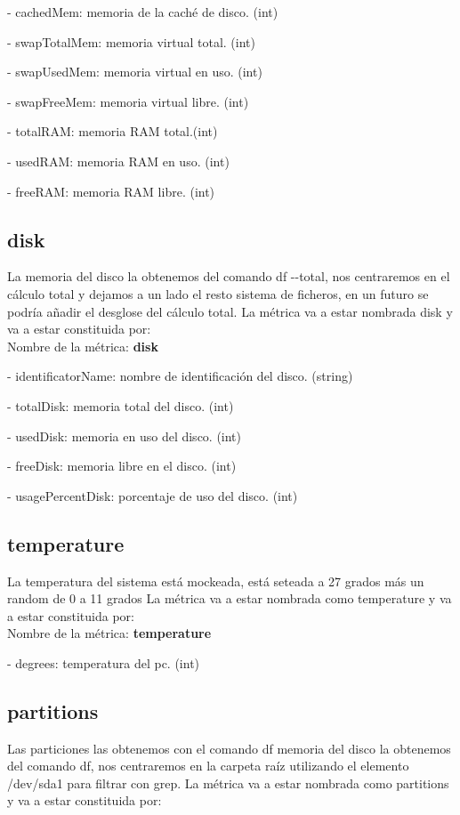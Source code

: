 \documentclass[ spanish, a4paper, 12pt, oneside]{report}
\begin{document}
\hyp{} cachedMem: memoria de la caché de disco. (int)

\hyp{} swapTotalMem: memoria virtual total. (int)

\hyp{} swapUsedMem: memoria virtual en uso. (int)

\hyp{} swapFreeMem: memoria virtual libre. (int)

\hyp{} totalRAM: memoria RAM total.(int)

\hyp{} usedRAM: memoria RAM en uso. (int)

\hyp{} freeRAM: memoria RAM libre. (int)

\subsection{disk}
La memoria del disco la obtenemos del comando df \hyp{}\hyp{}total, nos centraremos en el cálculo total y dejamos a un lado el resto 
sistema de ficheros, en un futuro se podría añadir el desglose del cálculo total. La métrica va a estar nombrada disk
y va a estar constituida por:\\
 
Nombre de la métrica: \textbf{disk}

\hyp{} identificatorName: nombre de identificación del disco. (string)
 
\hyp{} totalDisk: memoria total del disco. (int)
 
\hyp{} usedDisk: memoria en uso del disco. (int)
 
\hyp{} freeDisk: memoria libre en el disco. (int)
 
\hyp{} usagePercentDisk: porcentaje de uso del disco. (int)

\subsection{temperature}
La temperatura del sistema está mockeada, está seteada a 27 grados más un random de 0 a 11 grados 
La métrica va a estar nombrada como temperature y va a estar constituida por:\\
  
Nombre de la métrica: \textbf{temperature}
 
\hyp{} degrees: temperatura del pc. (int)

\subsection{partitions}
Las particiones las obtenemos con el comando df memoria del disco la obtenemos del comando df, nos centraremos en la carpeta raíz utilizando 
el elemento /dev/sda1 para filtrar con grep. La métrica va a estar nombrada como partitions y va a estar constituida por:\\
   
\end{document}
